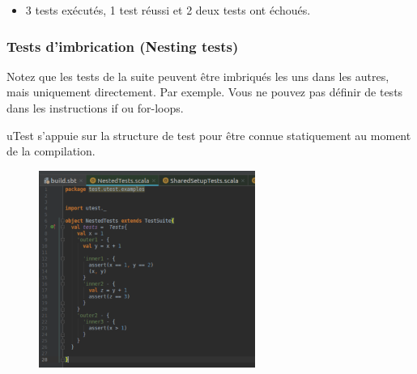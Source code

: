 \documentclass[12pt]{article}
\begin{document}

\par

\begin{itemize}
	\item 3 tests exécutés, 1 test réussi et 2 deux tests ont échoués. \par


\end{itemize}\subsubsection{Tests d'imbrication (Nesting tests) }

\begin{justify}
Notez que les tests de la suite peuvent être imbriqués les uns dans les autres, mais uniquement directement. Par exemple. Vous ne pouvez pas définir de tests dans les instructions if ou for-loops.
\end{justify}\par

\begin{justify}
uTest s'appuie sur la structure de test pour être connue statiquement au moment de la compilation.
\end{justify}\par




\begin{figure}[H]
	\begin{Center}
		\includegraphics[width=2.78in,height=2.53in]{./media/image7.png}
	\end{Center}
\end{figure}


\end{document}
